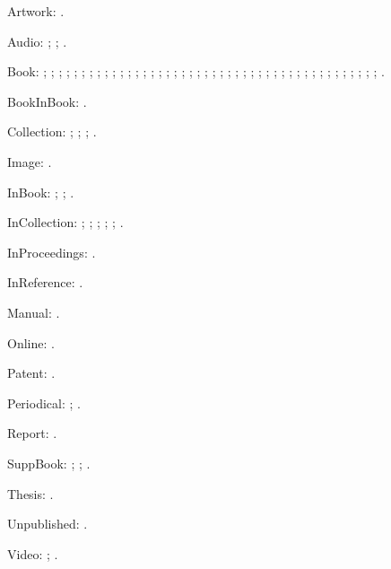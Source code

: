 \documentclass[a4paper,12pt]{report}
\begin{document}
Artwork: \autocite{leo:madonna}.

Audio: \autocite{greek:filmstrip:15}; \autocite{twain:audio};
\autocite{weed:flatiron}.

Book: \autocite{barrows:reading}; \autocite{churchill:letters};
\autocite{cohen:schiff}; \autocite{cotton:manufacture};
\autocite{creasey:ashe:blast}; \autocite{creasey:morton:hide};
\autocite{creasey:york:death}; \autocite{davenport:attention};
\autocite{feydeau:farces}; \autocite{furet:passing:eng};
\autocite{furet:passing:fr}; \autocite{harley:cartography};
\autocite{hopp:attalid}; \autocite{howell:marriage};
\autocite{lach:asia}; \autocite{lecarre:quest};
\autocite{levistrauss:savage}; \autocite{lynch:webstyle};
\autocite{maisonneuve:relations}; \autocite{mchugh:wake:15};
\autocite{menchu:crossing}; \autocite{meredith:letters};
\autocite{michelangelo:poems}; \autocite{mla:style};
\autocite{natrecoff:camera}; \autocite{palmatary:pottery};
\autocite{pelikan:christian}; \autocite{rodman:walk};
\autocite{schellinger:novel}; \autocite{sechzer:women};
\autocite{sereny:cries}; \autocite{soltes:georgia};
\autocite{stendhal:parma}; \autocite{suangtho:tectona};
\autocite{thompson:making}; \autocite{tillich:system};
\autocite{times:guide}; \autocite{turabian:manual};
\autocite{walker:columbia}; \autocite{wauchope:ceramics};
\autocite{weber:saugetiere}; \autocite{weresz};
\autocite{white:total}; \autocite{wright:evolution};
\autocite{wright:theory}.

BookInBook: \autocite{bernhard:boris}.

Collection: \autocite{brush:ornithology}; \autocite{kamrany:economic};
\autocite{prairie:state}; \autocite{zukowsky:chicago}.

Image: \autocite{bedford:photo}.

InBook: \autocite{ashbrook:brain}; \autocite{phibbs:diary};
\autocite{will:cohere}.

InCollection: \autocite{centinel:letters}; \autocite{ellet:galena};
\autocite{keating:dearborn}; \autocite{lippincott:chicago};
\autocite{sirosh:visualcortex}; \autocite{wiens:avian}.

InProceedings: \autocite{frede:inproc}.

InReference: \autocite[absolute]{oed:cdrom}.

Manual: \autocite{dyna:browser}.

Online: \autocite{powell:email}.

Patent: \autocite{petroff:impurity}.

Periodical: \autocite{good:wholeissue}; \autocite{whittington:water}.

Report: \autocite{herwign:office}.

SuppBook: \autocite{friedman:intro}; \autocite{polakow:afterw};
\autocite{prose:intro}.

Thesis: \autocite{murphy:silent:15}.

Unpublished: \autocite{nass:address}.

Video: \autocite{cleese:holygrail}; \autocite{episode:tv}.


\printbibliography[title=References]
\end{document}
